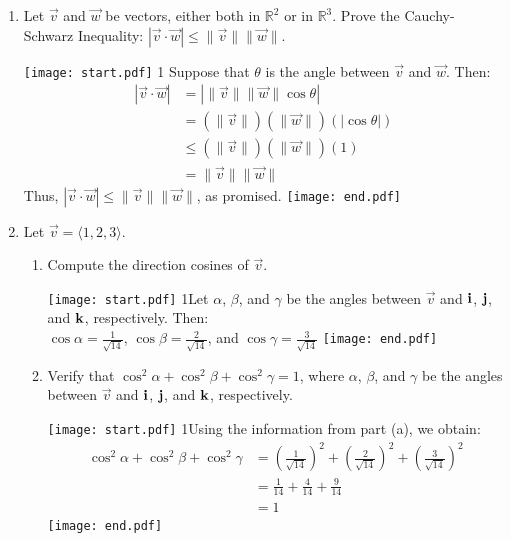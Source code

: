 \documentclass[12pt]{article}
\begin{document}
\begin{enumerate}
\newpage

\item Let $\overrightarrow{v}$ and $\overrightarrow{w}$ be vectors, either both in $\mathbb{R}^2$ or in $\mathbb{R}^3$.  Prove the Cauchy-Schwarz Inequality: $|\overrightarrow{v}\cdot \overrightarrow{w}|\leq \|\overrightarrow{v}\|\|\overrightarrow{w}\|$.

\texttt{[image: start.pdf]}
{{{1\linewidth}{
Suppose that $\theta$ is the angle between $\overrightarrow{v}$ and $\overrightarrow{w}$.  Then:
\begin{align*}
|\overrightarrow{v}\cdot\overrightarrow{w}|&=\left|\|\overrightarrow{v}\|\|\overrightarrow{w}\|\cos{\theta}\right|\\
&=\left(\|\overrightarrow{v}\|\right)\left(\|\overrightarrow{w}\|\right)\left(|\cos{\theta}|\right)\\
&\leq\left(\|\overrightarrow{v}\|\right)\left(\|\overrightarrow{w}\|\right)(1)\\
&=\|\overrightarrow{v}\| \|\overrightarrow{w}\|
\end{align*}
Thus, $|\overrightarrow{v}\cdot \overrightarrow{w}|\leq \|\overrightarrow{v}\|\|\overrightarrow{w}\|$, as promised.
}}}
\texttt{[image: end.pdf]}


\item Let $\overrightarrow{v}=\langle 1,2,3 \rangle$.

\begin{enumerate}

\item Compute the direction cosines of $\overrightarrow{v}$.

\texttt{[image: start.pdf]}
{{{1\linewidth}{Let $\alpha$, $\beta$, and $\gamma$ be the angles between $\overrightarrow{v}$ and ${\bf i}$, ${\bf j}$, and ${\bf k}$, respectively.  Then:\\ $\cos{\alpha}=\frac{1}{\sqrt{14}}$, $\cos{\beta}=\frac{2}{\sqrt{14}}$, and $\cos{\gamma}=\frac{3}{\sqrt{14}}$}}}
\texttt{[image: end.pdf]}


\item Verify that $\cos^2\alpha+\cos^2\beta+\cos^2\gamma=1$, where $\alpha$, $\beta$, and $\gamma$ be the angles between $\overrightarrow{v}$ and ${\bf i}$, ${\bf j}$, and ${\bf k}$, respectively.

\texttt{[image: start.pdf]}
{{{1\linewidth}{Using the information from part (a), we obtain:
\begin{align*}
\cos^2\alpha+\cos^2\beta+\cos^2\gamma&=\left(\frac{1}{\sqrt{14}}\right)^2+\left(\frac{2}{\sqrt{14}}\right)^2+\left(\frac{3}{\sqrt{14}}\right)^2\\
&=\frac{1}{14}+\frac{4}{14}+\frac{9}{14}\\
&=1
\end{align*}
}}}
\texttt{[image: end.pdf]}


\end{enumerate}

\end{enumerate}
\end{document}
